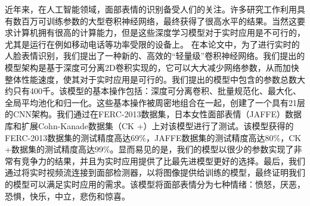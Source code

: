 \documentclass[master]{thesis-uestc}
\begin{document}
\begin{chineseabstract}
近年来，在人工智能领域，面部表情的识别备受人们的关注。许多研究工作利用具有数百万可训练参数的大型卷积神经网络，最终获得了很高水平的结果。当然这要求计算机拥有很高的计算能力，但是这些深度学习模型对于实时应用是不可行的，尤其是运行在例如移动电话等功率受限的设备上。
在本论文中，为了进行实时的人脸表情识别，我们提出了一种新的、高效的“轻量级”卷积神经网络。我们提出的模型架构是基于深度可分离2D卷积实现的，它可以大大减少网络参数，从而加快整体性能速度，使其对于实时应用是可行的。我们提出的模型中包含的参数总数大约只有400千。该模型的基本操作包括：深度可分离卷积、批量规范化、最大化、全局平均池化和归一化。这些基本操作被周密地组合在一起，创建了一个具有21层的CNN架构。我们通过在FERC-2013数据集，日本女性面部表情（JAFFE）数据库和扩展Cohn-Kanade数据集（CK +）上对该模型进行了测试。该模型获得的FERC-2013数据集的测试精度高达69\%，JAFFE数据集的测试精度高达80\%，CK +数据集的测试精度高达99\%。显而易见的是，我们的模型以很少的参数实现了非常有竞争力的结果，并且为实时应用提供了比最先进模型更好的选择。最后，我们通过将实时视频流连接到面部检测器，以将图像提供给训练的模型，最终证明我们的模型可以满足实时应用的需求。该模型将面部表情分为七种情绪：愤怒，厌恶，恐惧，快乐，中立，悲伤和惊喜。


\end{chineseabstract}
\end{document}
